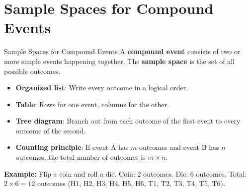 \section{Sample Spaces for Compound Events}

\begin{quickReview}{Sample Spaces for Compound Events}
A \textbf{compound event} consists of two or more simple events happening together. The \textbf{sample space} is the set of all possible outcomes.

\begin{itemize}[leftmargin=*]
    \item \textbf{Organized list}: Write every outcome in a logical order.
    \item \textbf{Table}: Rows for one event, columns for the other.
    \item \textbf{Tree diagram}: Branch out from each outcome of the first event to every outcome of the second.
    \item \textbf{Counting principle}: If event A has $m$ outcomes and event B has $n$ outcomes, the total number of outcomes is $m \times n$.
\end{itemize}

\medskip
\textbf{Example:} Flip a coin and roll a die. Coin: $2$ outcomes. Die: $6$ outcomes. Total: $2 \times 6 = 12$ outcomes (H1, H2, H3, H4, H5, H6, T1, T2, T3, T4, T5, T6).
\end{quickReview}

